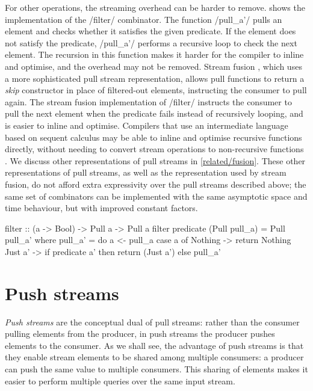 For other operations, the streaming overhead can be harder to remove.
 shows the implementation of the \Hs/filter/ combinator.
The function \Hs/pull_a'/ pulls an element and checks whether it satisfies the given predicate.
If the element does not satisfy the predicate, \Hs/pull_a'/ performs a recursive loop to check the next element.
The recursion in this function makes it harder for the compiler to inline and optimise, and the overhead may not be removed. %
Stream fusion \citep{coutts2007stream}, which uses a more sophisticated pull stream representation, allows pull functions to return a \emph{skip} constructor in place of filtered-out elements, instructing the consumer to pull again.
The stream fusion implementation of \Hs/filter/ instructs the consumer to pull the next element when the predicate fails instead of recursively looping, and is easier to inline and optimise.
Compilers that use an intermediate language based on sequent calculus may be able to inline and optimise recursive functions directly, without needing to convert stream operations to non-recursive functions \citep{maurer2017compiling}.
We discuss other representations of pull streams in \cref{related/fusion}.
These other representations of pull streams, as well as the representation used by stream fusion, do not afford extra expressivity over the pull streams described above; the same set of combinators can be implemented with the same asymptotic space and time behaviour, but with improved constant factors.

\begin{haskell}[float,caption=Pull implementation of \Hs/filter/,label=figs/impl/pull/filter]
filter :: (a -> Bool) -> Pull a -> Pull a
filter predicate (Pull pull_a) = Pull pull_a'
 where
  pull_a' = do
    a <- pull_a
    case a of
     Nothing -> return Nothing
     Just a' -> if   predicate a'
                then return (Just a')
                else pull_a'
\end{haskell}



\section{Push streams}
\label{taxonomy/push}

\emph{Push streams} are the conceptual dual of pull streams: rather than the consumer pulling elements from the producer, in push streams the producer pushes elements to the consumer.
As we shall see, the advantage of push streams is that they enable stream elements to be shared among multiple consumers: a producer can push the same value to multiple consumers.
This sharing of elements makes it easier to perform multiple queries over the same input stream.

